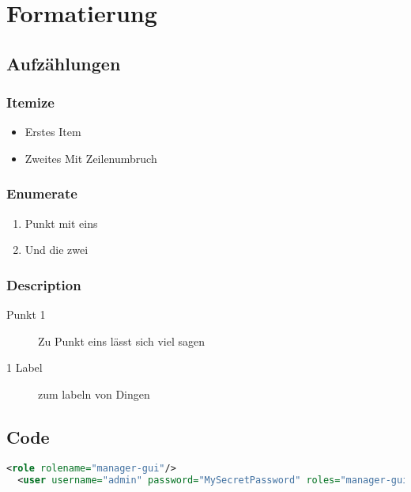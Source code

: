 
\chapter{Formatierung} %

\label{AppendixA} %

\section{Aufzählungen}

\subsection{Itemize}

\begin{itemize}
  \item Erstes Item
  \item Zweites
  Mit Zeilenumbruch
\end{itemize}

\subsection{Enumerate}

\begin{enumerate}
  \item Punkt mit eins
  \item Und die zwei
\end{enumerate}

\subsection{Description}

\begin{description}
  \item [Punkt 1] Zu Punkt eins lässt sich viel sagen
  \item [1 Label] zum labeln von Dingen
\end{description}

\section{Code}

\begin{lstlisting}[language=XML]
  <role rolename="manager-gui"/>
  <user username="admin" password="MySecretPassword" roles="manager-gui"/>
\end{lstlisting}